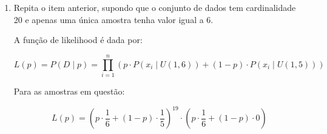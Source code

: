 \documentclass[12 pt]{article}
\begin{document}
\begin{enumerate}
    \item Repita o item anterior, supondo que o conjunto de dados tem cardinalidade 20 e apenas uma única amostra tenha valor igual a 6.
    \begin{tcolorbox}[colback=white, colframe=black, title=Resposta:]
        A função de likelihood é dada por:
        
        \[
        L(p) = P(D \mid p) = \prod_{i=1}^{n} \left( p \cdot P(x_i \mid U(1,6)) + (1 - p) \cdot P(x_i \mid U(1,5)) \right)
        \]
        
        Para as amostras em questão:
        
        \[
        L(p) = \left( p \cdot \frac{1}{6} + (1 - p) \cdot \frac{1}{5} \right)^{19} \cdot \left( p \cdot \frac{1}{6} + (1 - p) \cdot 0 \right)
        \]
    \end{tcolorbox}
\end{enumerate}
\end{document}
